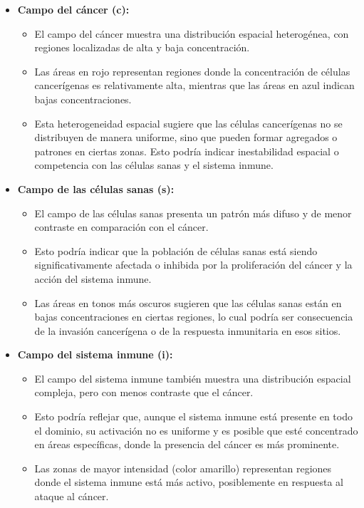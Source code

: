 \documentclass{article}
\begin{document}
\begin{itemize}
    \item \textbf{Campo del cáncer (c):}
    \begin{itemize}
        \item El campo del cáncer muestra una distribución espacial heterogénea, con regiones localizadas de alta y baja concentración.
        \item Las áreas en rojo representan regiones donde la concentración de células cancerígenas es relativamente alta, mientras que las áreas en azul indican bajas concentraciones.
        \item Esta heterogeneidad espacial sugiere que las células cancerígenas no se distribuyen de manera uniforme, sino que pueden formar agregados o patrones en ciertas zonas. Esto podría indicar inestabilidad espacial o competencia con las células sanas y el sistema inmune.
    \end{itemize}
    
    \item \textbf{Campo de las células sanas (s):}
    \begin{itemize}
        \item El campo de las células sanas presenta un patrón más difuso y de menor contraste en comparación con el cáncer.
        \item Esto podría indicar que la población de células sanas está siendo significativamente afectada o inhibida por la proliferación del cáncer y la acción del sistema inmune.
        \item Las áreas en tonos más oscuros sugieren que las células sanas están en bajas concentraciones en ciertas regiones, lo cual podría ser consecuencia de la invasión cancerígena o de la respuesta inmunitaria en esos sitios.
    \end{itemize}
    
    \item \textbf{Campo del sistema inmune (i):}
    \begin{itemize}
        \item El campo del sistema inmune también muestra una distribución espacial compleja, pero con menos contraste que el cáncer.
        \item Esto podría reflejar que, aunque el sistema inmune está presente en todo el dominio, su activación no es uniforme y es posible que esté concentrado en áreas específicas, donde la presencia del cáncer es más prominente.
        \item Las zonas de mayor intensidad (color amarillo) representan regiones donde el sistema inmune está más activo, posiblemente en respuesta al ataque al cáncer.
    \end{itemize}
\end{itemize}
\end{document}
